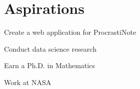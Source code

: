 \documentclass[]{deedy-resume-openfont}
\begin{document}
\begin{minipage}[t]{0.33\textwidth}
\section{Aspirations}
\vspace{\topsep}
\begin{tightemize}
\item Create a web application for ProcrastiNote
\item Conduct data science research 
\item Earn a Ph.D. in Mathematics
\item Work at NASA 
\end{tightemize}

\pagestyle{fancy}

\end{minipage}%
\end{document}
